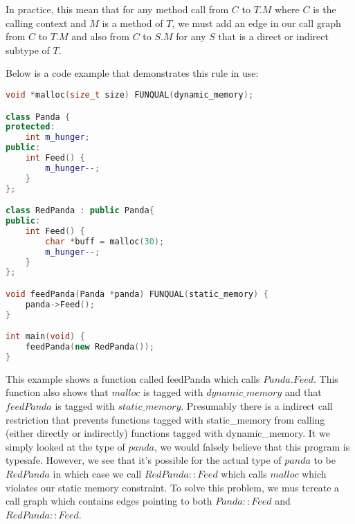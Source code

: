 In practice, this mean that for any method call from $C$ to $T.M$ where $C$ is the calling context and $M$ is a method of $T$, we must add an edge in our call graph from $C$ to $T.M$ and also from $C$ to $S.M$ for any $S$ that is a direct or indirect subtype of $T$.  

Below is a code example that demonstrates this rule in use:

\begin{minipage}[c]{0.95\textwidth}
\begin{lstlisting}[language=C++]
void *malloc(size_t size) FUNQUAL(dynamic_memory);

class Panda {
protected:
    int m_hunger;
public:
    int Feed() {
        m_hunger--;
    }
};

class RedPanda : public Panda{
public:
    int Feed() {
        char *buff = malloc(30);
        m_hunger--;
    }
};

void feedPanda(Panda *panda) FUNQUAL(static_memory) {
    panda->Feed();
}

int main(void) {
    feedPanda(new RedPanda());
}
\end{lstlisting}
\end{minipage}

This example shows a function called feedPanda which calls $Panda.Feed$.  This function also shows that $malloc$ is tagged with $dynamic\_memory$ and that $feedPanda$ is tagged with $static\_memory$.  Presumably there is a indirect call restriction that prevents functions tagged with static\_memory from calling (either directly or indirectly) functions tagged with dynamic\_memory.  It we simply looked at the type of $panda$, we would falsely believe that this program is typesafe.  However, we see that it's possible for the actual type of $panda$ to be $RedPanda$ in which case we call $RedPanda::Feed$ which calls $malloc$ which violates our static memory constraint.  To solve this problem, we mus tcreate a call graph which contains edges pointing to both $Panda::Feed$ and $RedPanda::Feed$.
